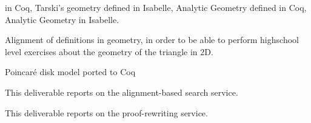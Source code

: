 \begin{workpackage}
\begin{wpdelivs}
\begin{wpdeliv}[due=3,miles=startup,id=aligninggeometries,dissem=PU,nature=DEM,lead=Bel]
{      in Coq, Tarski's geometry defined in Isabelle, Analytic Geometry
      defined in Coq, Analytic Geometry in Isabelle.}
  \end{wpdeliv}
  \begin{wpdeliv}[due=3,miles=startup,id=aligninggeometrieshighschool,dissem=PU,nature=DEM,lead=Str]
    {Alignment of definitions in geometry, in order to be able to
      perform highschool level exercises about the geometry of the
      triangle in 2D.}
  \end{wpdeliv}
  \begin{wpdeliv}[due=3,miles=startup,id=aligningpoincare,dissem=PU,nature=DEM,lead=Bel]
    {Poincar\'e disk model ported to Coq}
  \end{wpdeliv}
	\begin{wpdeliv}[due=36,miles=???,id=alignsearch,dissem=PU,nature=DEM,lead=Fau]
	{This deliverable reports on the alignment-based search service.}
	\end{wpdeliv}
	
	\begin{wpdeliv}[due=36,miles=???,id=alignproofrewr,dissem=PU,nature=DEM,lead=Bol]
	{This deliverable reports on the proof-rewriting service.}
	\end{wpdeliv}

\end{wpdelivs}
\end{workpackage}

